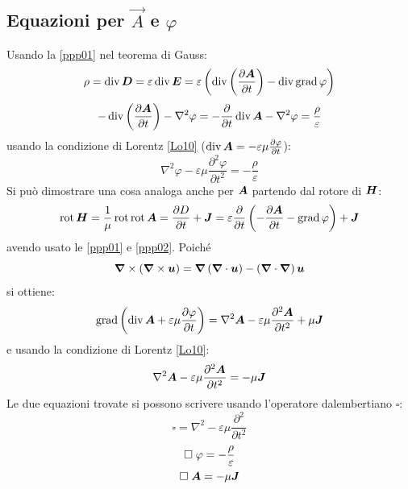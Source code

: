 \subsection{Equazioni per $\vec A$ e $\varphi$}
Usando la \eqref{ppp01} nel teorema di Gauss:
\begin{equation}
\rho=\operatorname{div}\boldsymbol{D}=\varepsilon\operatorname{div}\boldsymbol{E}=\varepsilon\left(\operatorname{div}\left(\frac{\partial\boldsymbol{A}}{\partial t}\right)-\operatorname{div}\operatorname{grad}\varphi\right)
\end{equation}
\begin{equation}
-\operatorname{div}\left(\frac{\partial\boldsymbol{A}}{\partial t}\right)-\nabla^2\varphi=-\frac{\partial}{\partial t}\operatorname{div}\boldsymbol{A}-\nabla^2\varphi=\frac{\rho}{\varepsilon}
\end{equation}
usando la condizione di Lorentz \eqref{Lo10} ($\operatorname{div} \boldsymbol{A}=-\varepsilon\mu\frac{\partial\varphi}{\partial t}$):
\begin{equation}
\nabla^2\varphi-\varepsilon\mu\frac{\partial^2\varphi}{\partial t^2}=-\frac{\rho}{\varepsilon}
\end{equation}
Si può dimostrare una cosa analoga anche per $\boldsymbol{A}$ partendo dal rotore di $\boldsymbol{H}$:
\begin{equation}
\operatorname{rot}\boldsymbol{H}=\frac{1}{\mu}\operatorname{rot}\operatorname{rot}\boldsymbol{A}=\frac{\partial D}{\partial t}+\boldsymbol{J}=\varepsilon\frac{\partial}{\partial t}\left(-\frac{\partial \boldsymbol{A}}{\partial t}-\operatorname{grad}\varphi\right)+\boldsymbol{J}
\end{equation}
avendo usato le \eqref{ppp01} e \eqref{ppp02}. Poiché
\begin{equation}
\boldsymbol{\nabla}\times\left(\boldsymbol{\nabla}\times\boldsymbol{u}\right)=\boldsymbol{\nabla}\left(\boldsymbol{\nabla}\cdot\boldsymbol{u}\right)-\left(\boldsymbol{\nabla}\cdot\boldsymbol{\nabla}\right)\boldsymbol{u}
\end{equation}
si ottiene:
\begin{equation}
\operatorname{grad}\left(\operatorname{div}\boldsymbol{A}+\varepsilon\mu\frac{\partial\varphi}{\partial t}\right)=\nabla^2\boldsymbol{A}-\varepsilon\mu\frac{\partial^2\boldsymbol{A}}{\partial t^2}+\mu\boldsymbol{J}
\end{equation}
e usando la condizione di Lorentz \eqref{Lo10}:
\begin{equation}
\nabla^2\boldsymbol{A}-\varepsilon\mu\frac{\partial^2\boldsymbol{A}}{\partial t^2}=-\mu\boldsymbol{J}
\end{equation}
Le due equazioni trovate si possono scrivere usando l'operatore dalembertiano $\square$:
\begin{equation}
\square=\nabla^2-\varepsilon\mu\frac{\partial^2}{\partial t^2}
\end{equation}
\begin{gather}
\square\;\varphi=-\dfrac{\rho}{\varepsilon}\\
\square\;\boldsymbol{A}=-\mu\boldsymbol{J}
\end{gather}

